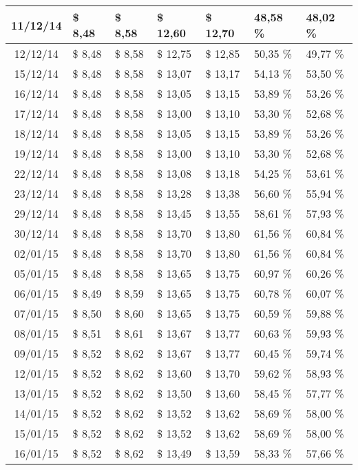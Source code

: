 \begin{center}
\begin{longtable}{|c|p{1.5cm}|p{1.5cm}|p{1.5cm}|p{1.5cm}|p{1.5cm}|p{1.5cm}|}
11/12/14 & \$ 8,48 & \$ 8,58 & \$ 12,60 & \$ 12,70 & 48,58 \% & 48,02 \% \\ \hline
12/12/14 & \$ 8,48 & \$ 8,58 & \$ 12,75 & \$ 12,85 & 50,35 \% & 49,77 \% \\ \hline
15/12/14 & \$ 8,48 & \$ 8,58 & \$ 13,07 & \$ 13,17 & 54,13 \% & 53,50 \% \\ \hline
16/12/14 & \$ 8,48 & \$ 8,58 & \$ 13,05 & \$ 13,15 & 53,89 \% & 53,26 \% \\ \hline
17/12/14 & \$ 8,48 & \$ 8,58 & \$ 13,00 & \$ 13,10 & 53,30 \% & 52,68 \% \\ \hline
18/12/14 & \$ 8,48 & \$ 8,58 & \$ 13,05 & \$ 13,15 & 53,89 \% & 53,26 \% \\ \hline
19/12/14 & \$ 8,48 & \$ 8,58 & \$ 13,00 & \$ 13,10 & 53,30 \% & 52,68 \% \\ \hline
22/12/14 & \$ 8,48 & \$ 8,58 & \$ 13,08 & \$ 13,18 & 54,25 \% & 53,61 \% \\ \hline
23/12/14 & \$ 8,48 & \$ 8,58 & \$ 13,28 & \$ 13,38 & 56,60 \% & 55,94 \% \\ \hline
29/12/14 & \$ 8,48 & \$ 8,58 & \$ 13,45 & \$ 13,55 & 58,61 \% & 57,93 \% \\ \hline
30/12/14 & \$ 8,48 & \$ 8,58 & \$ 13,70 & \$ 13,80 & 61,56 \% & 60,84 \% \\ \hline
02/01/15 & \$ 8,48 & \$ 8,58 & \$ 13,70 & \$ 13,80 & 61,56 \% & 60,84 \% \\ \hline
05/01/15 & \$ 8,48 & \$ 8,58 & \$ 13,65 & \$ 13,75 & 60,97 \% & 60,26 \% \\ \hline
06/01/15 & \$ 8,49 & \$ 8,59 & \$ 13,65 & \$ 13,75 & 60,78 \% & 60,07 \% \\ \hline
07/01/15 & \$ 8,50 & \$ 8,60 & \$ 13,65 & \$ 13,75 & 60,59 \% & 59,88 \% \\ \hline
08/01/15 & \$ 8,51 & \$ 8,61 & \$ 13,67 & \$ 13,77 & 60,63 \% & 59,93 \% \\ \hline
09/01/15 & \$ 8,52 & \$ 8,62 & \$ 13,67 & \$ 13,77 & 60,45 \% & 59,74 \% \\ \hline
12/01/15 & \$ 8,52 & \$ 8,62 & \$ 13,60 & \$ 13,70 & 59,62 \% & 58,93 \% \\ \hline
13/01/15 & \$ 8,52 & \$ 8,62 & \$ 13,50 & \$ 13,60 & 58,45 \% & 57,77 \% \\ \hline
14/01/15 & \$ 8,52 & \$ 8,62 & \$ 13,52 & \$ 13,62 & 58,69 \% & 58,00 \% \\ \hline
15/01/15 & \$ 8,52 & \$ 8,62 & \$ 13,52 & \$ 13,62 & 58,69 \% & 58,00 \% \\ \hline
16/01/15 & \$ 8,52 & \$ 8,62 & \$ 13,49 & \$ 13,59 & 58,33 \% & 57,66 \% \\ \hline

\end{longtable}
\end{center}
